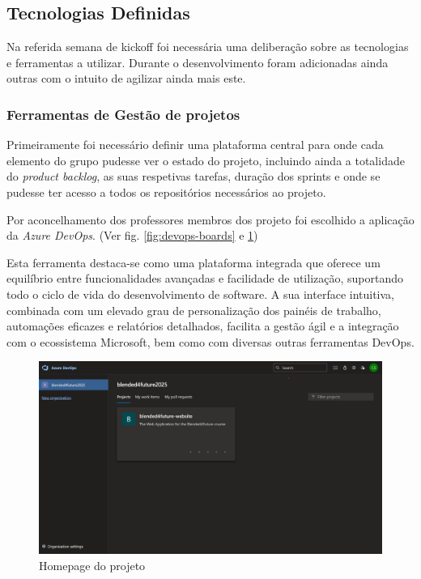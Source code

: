 \subsection{Tecnologias Definidas}

Na referida semana de kickoff foi necessária uma deliberação sobre as tecnologias e ferramentas a utilizar. Durante o desenvolvimento foram adicionadas ainda outras com o intuito de agilizar ainda mais este.

\subsubsection{Ferramentas de Gestão de projetos}

Primeiramente foi necessário definir uma plataforma central para onde cada elemento do grupo pudesse ver o estado do projeto, incluindo ainda a totalidade do \textit{product backlog}, as suas respetivas tarefas, duração dos sprints e onde se pudesse ter acesso a todos os repositórios necessários ao projeto.

Por aconcelhamento dos professores membros dos projeto foi escolhido a aplicação da \textit{Azure DevOps}. (Ver fig. \ref{fig:devops-boards} e \ref{fig:devops-homepage})

Esta ferramenta destaca-se como uma plataforma integrada que oferece um equilíbrio entre funcionalidades avançadas e facilidade de utilização, suportando todo o ciclo de vida do desenvolvimento de software. A sua interface intuitiva, combinada com um elevado grau de personalização dos painéis de trabalho, automações eficazes e relatórios detalhados, facilita a gestão ágil e a integração com o ecossistema Microsoft, bem como com diversas outras ferramentas DevOps. 

\begin{figure}
    \includegraphics[width=\linewidth]{capitulos/cap1-introducao/imagens/ferramentas/devops-homepage.png}
    \caption{Homepage do projeto}
    \label{fig:devops-homepage}
\end{figure}

